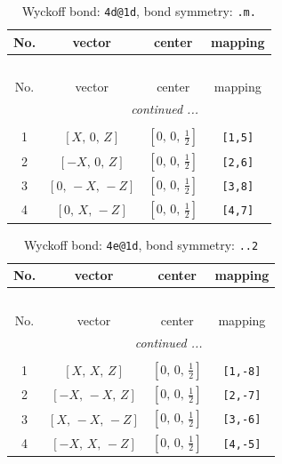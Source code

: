\documentclass[fleqn,8pt]{jsarticle}
\begin{document}
\begin{longtable}{cccc}
\caption{Wyckoff bond: {\tt 4d@1d}, bond symmetry: {\tt .m.}}
 \\
 \hline \hline
No. & vector & center & mapping \\ \hline \endfirsthead

\multicolumn{3}{l}{\tablename\ \thetable{}} \\
 \hline \hline
No. & vector & center & mapping \\ \hline \endhead

 \hline \hline
\multicolumn{3}{r}{\footnotesize\it continued ...} \\ \endfoot

 \hline \hline
\multicolumn{3}{r}{} \\ \endlastfoot

1 & $\left[ X,\, 0,\, Z \right]$ & $\left[ 0,\, 0,\, \frac{1}{2} \right]$ & {\tt [1,5]} \\ \hline
2 & $\left[ - X,\, 0,\, Z \right]$ & $\left[ 0,\, 0,\, \frac{1}{2} \right]$ & {\tt [2,6]} \\ \hline
3 & $\left[ 0,\, - X,\, - Z \right]$ & $\left[ 0,\, 0,\, \frac{1}{2} \right]$ & {\tt [3,8]} \\ \hline
4 & $\left[ 0,\, X,\, - Z \right]$ & $\left[ 0,\, 0,\, \frac{1}{2} \right]$ & {\tt [4,7]} \\
\end{longtable}
\renewcommand{\arraystretch}{1.2}
\begin{longtable}{cccc}
\caption{Wyckoff bond: {\tt 4e@1d}, bond symmetry: {\tt ..2}}
 \\
 \hline \hline
No. & vector & center & mapping \\ \hline \endfirsthead

\multicolumn{3}{l}{\tablename\ \thetable{}} \\
 \hline \hline
No. & vector & center & mapping \\ \hline \endhead

 \hline \hline
\multicolumn{3}{r}{\footnotesize\it continued ...} \\ \endfoot

 \hline \hline
\multicolumn{3}{r}{} \\ \endlastfoot

1 & $\left[ X,\, X,\, Z \right]$ & $\left[ 0,\, 0,\, \frac{1}{2} \right]$ & {\tt [1,-8]} \\ \hline
2 & $\left[ - X,\, - X,\, Z \right]$ & $\left[ 0,\, 0,\, \frac{1}{2} \right]$ & {\tt [2,-7]} \\ \hline
3 & $\left[ X,\, - X,\, - Z \right]$ & $\left[ 0,\, 0,\, \frac{1}{2} \right]$ & {\tt [3,-6]} \\ \hline
4 & $\left[ - X,\, X,\, - Z \right]$ & $\left[ 0,\, 0,\, \frac{1}{2} \right]$ & {\tt [4,-5]} \\
\end{longtable}
\end{document}
